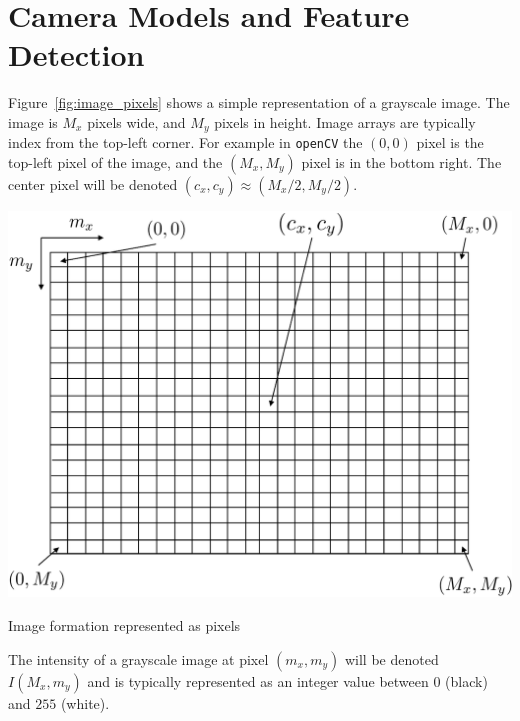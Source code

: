 
\chapter{Camera Models and Feature Detection}
\label{chap:camera_features}

Figure~\ref{fig:image_pixels} shows a simple representation of a grayscale image.  The image is $M_x$ pixels wide, and $M_y$ pixels in height.  Image arrays are typically index from the top-left corner.  For example in \texttt{openCV} the $(0,0)$ pixel is the top-left pixel of the image, and the $(M_x, M_y)$ pixel is in the bottom right.  The center pixel will be denoted $(c_x, c_y)\approx (M_x/2, M_y/2)$. 
\begin{marginfigure}
  \includegraphics[width=\linewidth]{chap6_camera_features/figures/image_pixels}
  \caption{Image formation represented as pixels}
  \label{fig:image_pixels}  
\end{marginfigure}
The intensity of a grayscale image at pixel $(m_x, m_y)$ will be denoted $I(M_x,m_y)$ and is  typically represented as an integer value between $0$ (black) and $255$ (white).  


